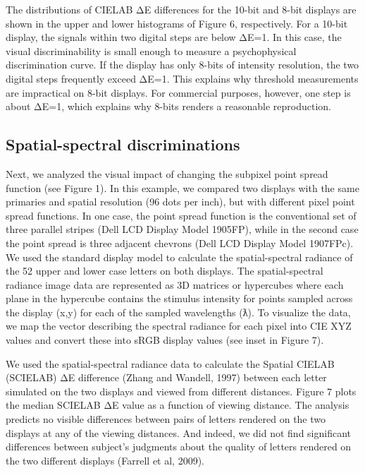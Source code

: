 \documentclass[
  letterpaper,
]{book}
\begin{document}
The distributions of CIELAB ΔE differences for the 10-bit and 8-bit
displays are shown in the upper and lower histograms of Figure 6,
respectively. For a 10-bit display, the signals within two digital steps
are below ΔE=1. In this case, the visual discriminability is small
enough to measure a psychophysical discrimination curve. If the display
has only 8-bits of intensity resolution, the two digital steps
frequently exceed ΔE=1. This explains why threshold measurements are
impractical on 8-bit displays. For commercial purposes, however, one
step is about ΔE=1, which explains why 8-bits renders a reasonable
reproduction.

\subsection{Spatial-spectral
discriminations}\label{spatial-spectral-discriminations}

Next, we analyzed the visual impact of changing the subpixel point
spread function (see Figure 1). In this example, we compared two
displays with the same primaries and spatial resolution (96 dots per
inch), but with different pixel point spread functions. In one case, the
point spread function is the conventional set of three parallel stripes
(Dell LCD Display Model 1905FP), while in the second case the point
spread is three adjacent chevrons (Dell LCD Display Model 1907FPc). We
used the standard display model to calculate the spatial-spectral
radiance of the 52 upper and lower case letters on both displays. The
spatial-spectral radiance image data are represented as 3D matrices or
hypercubes where each plane in the hypercube contains the stimulus
intensity for points sampled across the display (x,y) for each of the
sampled wavelengths (ƛ). To visualize the data, we map the vector
describing the spectral radiance for each pixel into CIE XYZ values and
convert these into sRGB display values (see inset in Figure 7).

We used the spatial-spectral radiance data to calculate the Spatial
CIELAB (SCIELAB) ΔE difference (Zhang and Wandell, 1997) between each
letter simulated on the two displays and viewed from different
distances. Figure 7 plots the median SCIELAB ΔE value as a function of
viewing distance. The analysis predicts no visible differences between
pairs of letters rendered on the two displays at any of the viewing
distances. And indeed, we did not find significant differences between
subject's judgments about the quality of letters rendered on the two
different displays (Farrell et al, 2009).
\end{document}
